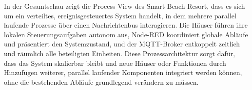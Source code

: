 In der Gesamtschau zeigt die Process View des Smart Beach Resort, dass es sich um ein verteiltes, ereignisgesteuertes System handelt, in dem mehrere parallel laufende Prozesse über einen Nachrichtenbus interagieren. Die Häuser führen ihre lokalen Steuerungsaufgaben autonom aus, Node-RED koordiniert globale Abläufe und präsentiert den Systemzustand, und der MQTT-Broker entkoppelt zeitlich und räumlich alle beteiligten Einheiten. Diese Prozessarchitektur sorgt dafür, dass das System skalierbar bleibt und neue Häuser oder Funktionen durch Hinzufügen weiterer, parallel laufender Komponenten integriert werden können, ohne die bestehenden Abläufe grundlegend verändern zu müssen.